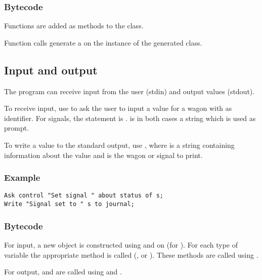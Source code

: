 \subsubsection*{Bytecode}

Functions are added as methods to the class.

Function calls generate a  on the instance of the generated class.

\subsection{Input and output}

The program can receive input from the user (stdin) and output values (stdout).

To receive input, use  to ask the user to input a value for a wagon with  as identifier. For signals, the statement is .  is in both cases a string which is used as prompt.

To write a value to the standard output, use , where  is a string containing information about the value and  is the wagon or signal to print.

\subsubsection*{Example}

\begin{lstlisting}
Ask control "Set signal " about status of s;
Write "Signal set to " s to journal;
\end{lstlisting}

\subsubsection*{Bytecode}

For input, a new  object is constructed using  and  on  (for ). For each type of variable the appropriate method is called (,  or ). These methods are called using .

For output,  and  are called using  and .

